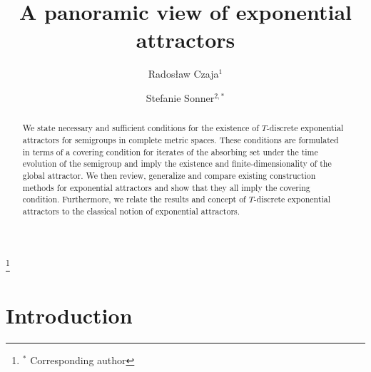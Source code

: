 \documentclass[a4paper,12pt,reqno]{amsart}
\theoremstyle{plain}
\theoremstyle{definition}
\numberwithin{equation}{section}
\begin{document}
\title[A panoramic view of exponential attractors]{A panoramic view of exponential attractors}

\author{Rados{\l}aw Czaja$^{1}$}

\author{Stefanie Sonner$^{2,*}$}

\address{$^1$Institute of Mathematics, University of Silesia in Katowice, Bankowa 14, 40-007 Katowice, Poland.
E-mail address: \textup{radoslaw.czaja@us.edu.pl}}

\address{$^2$Department of Mathematics, Radboud University Nijmegen, PO Box 9010, 6500 GL Nijmegen, The Netherlands.
E-mail address: \textup{stefanie.sonner@ru.nl}}

\thanks{$^{*}$ Corresponding author}



\begin{abstract}
We state necessary and sufficient conditions for the existence of $T$-discrete exponential attractors for semigroups in complete metric spaces. These conditions are formulated in terms of a covering condition for iterates of the absorbing set under the time evolution of the semigroup and imply the existence and finite-dimensionality of the  global attractor. We then review, generalize and compare existing construction methods for exponential attractors and show that they all imply the covering condition. Furthermore, we relate the results and concept of $T$-discrete exponential attractors to the classical notion of exponential attractors.
\end{abstract}

\maketitle
\section{Introduction}
\end{document}

